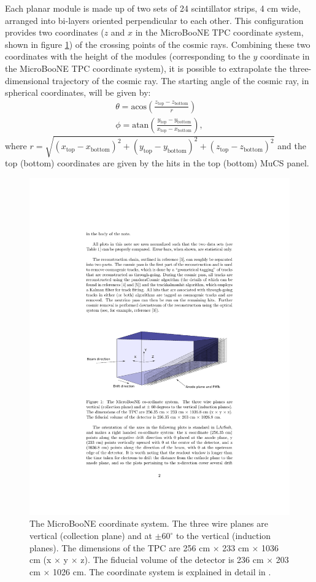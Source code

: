\documentclass[a4paper]{scrartcl}
\begin{document}
Each planar module is made up of two sets of 24 scintillator strips, 4 cm wide, arranged into bi-layers oriented perpendicular to each other. This configuration provides two coordinates ($z$ and $x$ in the MicroBooNE TPC coordinate system, shown in figure \ref{fig:coord}) of the crossing points of the cosmic rays. Combining these two coordinates with the height of the modules (corresponding to the $y$ coordinate in the MicroBooNE TPC coordinate system), it is possible to extrapolate the three-dimensional trajectory of the cosmic ray.
The starting angle of the cosmic ray, in spherical coordinates, will be given by:
\begin{align}
  \theta = \mathrm{acos}\left(\frac{z_{\mathrm{top}}-z_{\mathrm{bottom}}}{r}\right) \\
  \phi = \mathrm{atan}\left(\frac{y_{\mathrm{top}}-y_{\mathrm{bottom}}}{x_{\mathrm{top}}-x_{\mathrm{bottom}}}\right),
\end{align}
where $r = \sqrt{(x_{\mathrm{top}}-x_{\mathrm{bottom}})^2+(y_{\mathrm{top}}-y_{\mathrm{bottom}})^2+(z_{\mathrm{top}}-z_{\mathrm{bottom}})^2}$ and the top (bottom) coordinates are given by the hits in the top (bottom) MuCS panel.
\begin{figure}[htbp]
  \begin{center}
    \includegraphics[width=0.8\linewidth]{figures/coord.pdf}

    \caption{The MicroBooNE coordinate system. The three wire planes are vertical (collection plane) and at  $\pm60^{\circ}$ to the vertical (induction planes). The dimensions of the TPC are 256 cm $\times$ 233 cm $\times$ 1036 cm (x $\times$ y $\times$ z). The fiducial volume of the detector is 236 cm $\times$ 203 cm $\times$ 1026 cm. The coordinate system is explained in detail in \cite{mcdata}.} \label{fig:coord}
  \end{center}
\end{figure}
\end{document}
